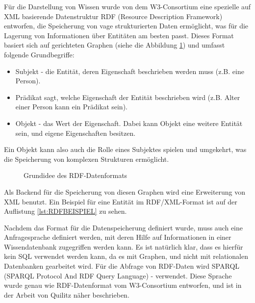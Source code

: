 Für die Darstellung von Wissen wurde von dem W3-Consortium\cite{klyne2006resource} eine spezielle auf XML basierende Datenstruktur RDF (Resource Description Framework) entworfen, die Speicherung von vage strukturierten Daten ermöglicht, was für die Lagerung von Informationen über Entitäten am besten passt. Dieses Format basiert sich auf gerichteten Graphen (siehe die Abbildung \ref{fig:graph-rdf}) und umfasst folgende Grundbegriffe:
\begin{itemize}
\item Subjekt - die Entität, deren Eigenschaft beschrieben werden muss (z.B. eine Person).
\item Prädikat sagt, welche Eigenschaft der Entität beschrieben wird (z.B. Alter einer Person kann ein Prädikat sein).
\item Objekt - das Wert der Eigenschaft. Dabei kann Objekt eine weitere Entität sein, und eigene Eigenschaften besitzen. 
\end{itemize}
Ein Objekt kann also auch die Rolle eines Subjektes spielen und umgekehrt, was die Speicherung von komplexen Strukturen ermöglicht.

\begin{figure}[ht]
\vbox{\small}
\caption{Grundidee des RDF-Datenformats}
\label{fig:graph-rdf}
\end{figure}

Als Backend für die Speicherung von diesen Graphen wird eine Erweiterung von XML benutzt. Ein Beispiel für eine Entität im RDF/XML-Format ist auf der Auflistung \ref{lst:RDFBEISPIEL} zu sehen.

\lstset{language=XML}


Nachdem das Format für die Datenspeicherung definiert wurde, muss auch eine Anfragesprache definiert werden, mit deren Hilfe auf Informationen in einer Wissendatenbank zugegriffen werden kann. Es ist natürlich klar, dass es hierfür kein SQL verwendet werden kann, da es mit Graphen, und nicht mit relationalen Datenbanken gearbeitet wird. Für die Abfrage von RDF-Daten wird SPARQL (SPARQL Protocol And RDF Query Language) - verwendet. Diese Sprache wurde genau wie RDF-Datenformat vom W3-Consortium entworfen, und ist in der Arbeit von Quilitz\cite{quilitz2008querying} näher beschrieben.

